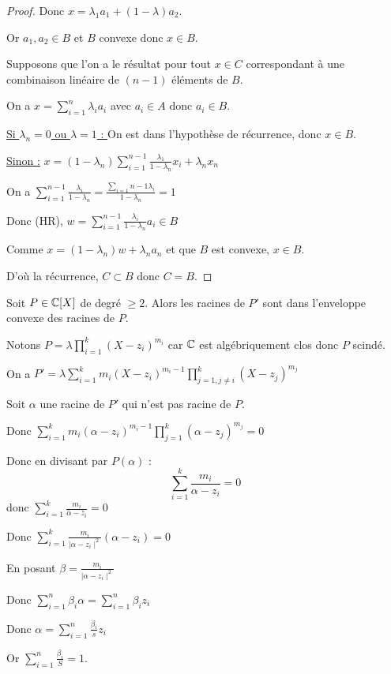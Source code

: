 \begin{proof}
    Donc $x = \lambda_1 a_1 + (1 - \lambda)a_2$. 

    Or $a_1, a_2 \in B$ et $B$ convexe donc $x \in B$. 


    Supposons que l'on a le résultat pour tout $x \in C$ correspondant à une combinaison
    linéaire de $(n - 1)$ éléments de $B$. 

    On a $\displaystyle x = \sum_{i = 1}^{n } \lambda_i a_i$ avec $a_i \in A$ donc $a_i \in B$.

    \quad \underline{Si $\lambda_n = 0$ ou $\lambda = 1$ : } On est dans l'hypothèse 
    de récurrence, donc $x \in B$. 

    \quad \underline{Sinon :} $\displaystyle x = (1 - \lambda_n) \sum_{i = 1}^{n - 1} \frac{\lambda_1}{1 - \lambda_n} x_i + \lambda_n x_n$

    On a $\displaystyle \sum_{i = 1}^{n - 1} \frac{\lambda_i}{1 - \lambda_n} = \frac{\sum_{i = 1}{n - 1} \lambda_i}{1 - \lambda_n} = 1$

    Donc (HR), $\displaystyle w = \sum_{i = 1}^{n-1} \frac{\lambda_i}{1 - \lambda_n} a_i \in B$

    Comme $\displaystyle x = (1 - \lambda_n)w + \lambda_n a_n$ et que $B$ est convexe, $x \in B$. 

    D'où la récurrence, $C \subset B$ donc $C = B$. 

\end{proof}

\begin{exemple}
    Soit $P \in \mathbb{C}[X]$ de degré $\geqslant 2$. Alors les racines de $P'$ sont dans 
    l'enveloppe convexe des racines de $P$. 

    Notons $\displaystyle P = \lambda \prod_{i = 1}^{k }(X - z_i)^{m_i}$ car $\mathbb{C}$ est algébriquement clos
    donc $P$ scindé. 

    On a $\displaystyle P' = \lambda \sum_{i = 1}^{k } m_i (X - z_i)^{m_i - 1} \prod_{j = 1, j \neq i}^{k}(X - z_j)^{m_j}$

    Soit $\alpha$ une racine de $P'$ qui n'est pas racine de $P$.

    Donc $\displaystyle \sum_{i = 1}^{k }m_i(\alpha - z_i)^{m_i - 1} \prod_{j = 1}^{k } (\alpha - z_j)^{m_j} = 0$

    Donc en divisant par $P(\alpha)$ : 
    $$ \sum_{i = 1}^{k } \frac{m_i}{\alpha - z_i} = 0$$
    donc $\displaystyle \sum_{i = 1}^{k } \frac{m_i}{\bar \alpha - \bar z_i} = 0$
    
    Donc $\displaystyle \sum_{i = 1}^{k }\frac{m_i }{\mid \alpha - z_i \mid ^2} (\alpha - z_i) = 0$
    
    En posant $\beta = \frac{m_i}{\mid \alpha - z_i \mid ^2}$
    
    Donc $\displaystyle \sum_{i = 1}^{n }\beta_i \alpha = \sum_{i = 1}^{n } \beta_i z_i$

    Donc $\displaystyle \alpha = \sum_{i = 1}^{n }\frac{\beta_i}{s} z_i$

    Or $\displaystyle \sum_{i = 1}^{n }\frac{\beta_i }{S } = 1$. 
\end{exemple}

